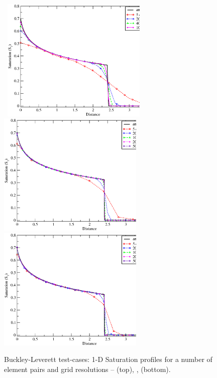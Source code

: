 \begin{figure}[h]
\vbox{\hbox{\hspace{2.5cm}
    \includegraphics[width=0.62\textwidth]{./diagrams/BL_1d_P0DGP1_convergence.eps}}
\vspace{-.0cm}\hbox{\hspace{2.5cm}
    \includegraphics[width=0.62\textwidth]{./diagrams/BL_1d_P1DGP2_convergence.eps}}
\vspace{-.0cm}\hbox{\hspace{2.5cm}
    \includegraphics[width=0.62\textwidth]{./diagrams/BL_1d_P2DGP3_convergence.eps}}}
    \caption{Buckley-Leverett test-cases: 1-D Saturation profiles for a number of element pairs and grid resolutions --  (top), ,  (bottom).\label{fig:BL_profiles}}
\end{figure}

